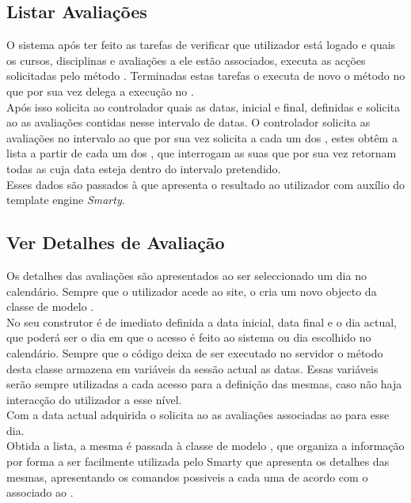 \subsection{Listar Avaliações}
O sistema após ter feito as tarefas de verificar que utilizador está logado e quais os cursos, disciplinas e avaliações a ele estão associados, executa as acções solicitadas pelo método . Terminadas estas tarefas o  executa de novo o método  no  que por sua vez delega a execução no .\\
Após isso solicita ao controlador  quais as datas, inicial e final, definidas e solicita ao  as avaliações contidas nesse intervalo de datas. O controlador solicita as avaliações no intervalo ao  que por sua vez solicita a cada um dos , estes obtêm a lista a partir de cada um dos , que interrogam as suas  que por sua vez retornam todas as  cuja data esteja dentro do intervalo pretendido.\\
Esses dados são passados à  que apresenta o resultado ao utilizador com auxílio do template engine \textit{Smarty}.

\subsection{Ver Detalhes de Avaliação}
Os detalhes das avaliações são apresentados ao ser seleccionado um dia no calendário. Sempre que o utilizador acede ao site, o  cria um novo objecto da classe de modelo .\\
No seu construtor é de imediato definida a data inicial, data final e o dia actual, que poderá ser o dia em que o acesso é feito ao sistema ou dia escolhido no calendário. Sempre que o código deixa de ser executado no servidor o método  desta classe armazena em variáveis da sessão actual as datas. Essas variáveis serão sempre utilizadas a cada acesso para a definição das mesmas, caso não haja interacção do utilizador a esse nível.\\
Com a data actual adquirida o  solicita ao  as avaliações associadas ao  para esse dia.\\
Obtida a lista, a mesma é passada à classe de modelo , que organiza a informação por forma a ser facilmente utilizada pelo Smarty que apresenta os detalhes das mesmas, apresentando os comandos possiveis a cada uma de acordo com o  associado ao .
 
